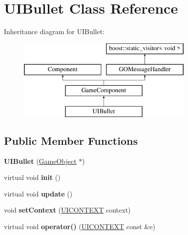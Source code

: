 \hypertarget{class_u_i_bullet}{}\section{U\+I\+Bullet Class Reference}
\label{class_u_i_bullet}
Inheritance diagram for U\+I\+Bullet\+:\begin{figure}[H]
\begin{center}
\leavevmode
\includegraphics[height=4.000000cm]{class_u_i_bullet}
\end{center}
\end{figure}
\subsection*{Public Member Functions}
\begin{DoxyCompactItemize}
\item 
\hypertarget{class_u_i_bullet_a5036f0f1649cbb182b46a37ba4096bc1}{}\label{class_u_i_bullet_a5036f0f1649cbb182b46a37ba4096bc1} 
{\bfseries U\+I\+Bullet} (\hyperlink{class_game_object}{Game\+Object} $\ast$)
\item 
\hypertarget{class_u_i_bullet_a46d657568a2458cbf6206265e17f966b}{}\label{class_u_i_bullet_a46d657568a2458cbf6206265e17f966b} 
virtual void {\bfseries init} ()
\item 
\hypertarget{class_u_i_bullet_ad88e53627d06397907b9537c809626ed}{}\label{class_u_i_bullet_ad88e53627d06397907b9537c809626ed} 
virtual void {\bfseries update} ()
\item 
\hypertarget{class_u_i_bullet_a92bc30d8dc5a23773e0a12ff92d400ae}{}\label{class_u_i_bullet_a92bc30d8dc5a23773e0a12ff92d400ae} 
void {\bfseries set\+Context} (\hyperlink{struct_u_i_c_o_n_t_e_x_t}{U\+I\+C\+O\+N\+T\+E\+XT} context)
\item 
\hypertarget{class_u_i_bullet_a49381a5e15883e5559512c5bfee46cc3}{}\label{class_u_i_bullet_a49381a5e15883e5559512c5bfee46cc3} 
virtual void {\bfseries operator()} (\hyperlink{struct_u_i_c_o_n_t_e_x_t}{U\+I\+C\+O\+N\+T\+E\+XT} const \&e)
\end{DoxyCompactItemize}
